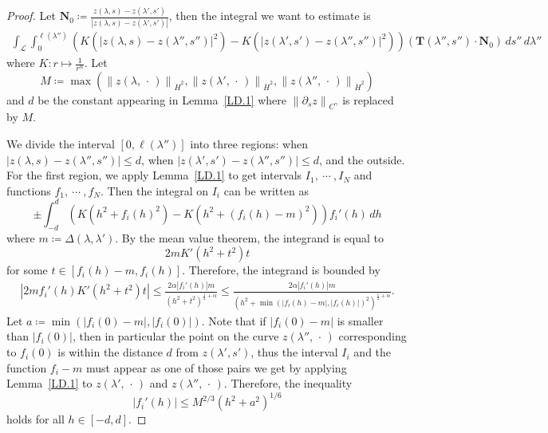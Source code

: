 \documentclass[reqno,centertags,12pt]{amsart}
\theoremstyle{definition}
\numberwithin{equation}{section}
\newcommand{\abs}[1]{\left\lvert#1\right\rvert}
\newcommand{\norm}[1]{\left\|#1\right\|}
\begin{document}
\begin{proof}
    Let $\mathbf{N}_{0}\coloneqq\frac{z(\lambda,s) - z(\lambda',s')}
    {\abs{z(\lambda,s) - z(\lambda',s')}}$, then the integral we want to estimate is
    \begin{align*}
        \int_{\mathcal{L}}\int_{0}^{\ell(\lambda'')}
        \left(
            K\left(\abs{z(\lambda,s) - z(\lambda'',s'')}^{2}\right)
            -K\left(\abs{z(\lambda',s') - z(\lambda'',s'')}^{2}\right)
        \right)
        (\mathbf{T}(\lambda'',s'')\cdot\mathbf{N}_{0})
        \,ds''\,d\lambda''
    \end{align*}
    where $K\colon r\mapsto \frac{1}{r^{\alpha}}$. Let
    \[
        M\coloneqq\max\left(
            \norm{z(\lambda,\,\cdot\,)}_{\dot{H}^{2}},
            \norm{z(\lambda',\,\cdot\,)}_{\dot{H}^{2}},
            \norm{z(\lambda'',\,\cdot\,)}_{\dot{H}^{2}}
        \right)
    \]
    and $d$ be the constant appearing in Lemma~\ref{LD.1}
    where $\norm{\partial_{s}z}_{C^{\gamma}}$ is replaced by $M$.

    We divide the interval $[0,\ell(\lambda'')]$ into three regions:
    when $\abs{z(\lambda,s) - z(\lambda'',s'')}\leq d$, when
    $\abs{z(\lambda',s') - z(\lambda'',s'')}\leq d$, and the outside.
    For the first region, we apply Lemma~\ref{LD.1} to get intervals
    $I_{1},\ \cdots\ ,I_{N}$ and functions $f_{1},\ \cdots\ ,f_{N}$.
    Then the integral on $I_{i}$ can be written as
    \[
        \pm\int_{-d}^{d}
        \left(
            K\left(h^{2}+f_{i}(h)^{2}\right)
            - K\left(h^{2}+(f_{i}(h)-m)^{2}\right)
        \right)
        f_{i}'(h)\,dh
    \]
    where $m\coloneqq\Delta(\lambda,\lambda')$.
    By the mean value theorem, the integrand is equal to
    \[
        2mK'(h^{2}+t^{2})t
    \]
    for some $t\in[f_{i}(h)-m,f_{i}(h)]$. Therefore, the integrand is bounded by
    \begin{align*}
        \abs{2mf_{i}'(h)K'(h^{2}+t^{2})t}
        \leq \frac{2\alpha\abs{f_{i}'(h)}m}{(h^{2}+t^{2})^{\frac{1}{2}+\alpha}}
        \leq \frac{2\alpha\abs{f_{i}'(h)}m}
        {(h^{2}+\min\left(\abs{f_{i}(h)-m},\abs{f_{i}(h)}\right)^{2})^{\frac{1}{2}+\alpha}}.
    \end{align*}
    Let $a\coloneqq\min\left(\abs{f_{i}(0)-m},\abs{f_{i}(0)}\right)$.
    Note that if $\abs{f_{i}(0)-m}$ is smaller than $\abs{f_{i}(0)}$, then in particular
    the point on the curve $z(\lambda'',\,\cdot\,)$ corresponding to $f_{i}(0)$
    is within the distance $d$ from $z(\lambda',s')$, thus the interval $I_{i}$
    and the function $f_{i} - m$ must appear as one of those pairs we get by applying
    Lemma~\ref{LD.1} to $z(\lambda',\,\cdot\,)$ and
    $z(\lambda'',\,\cdot\,)$. Therefore, the inequality
    \[
        \abs{f_{i}'(h)}\leq M^{2/3}(h^{2}+a^{2})^{1/6}
    \]
    holds for all $h\in[-d,d]$.


\end{proof}
\end{document}
